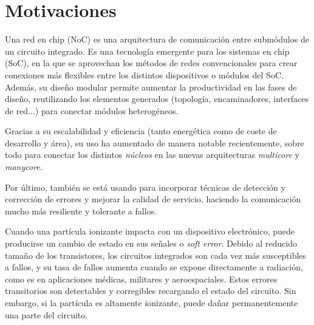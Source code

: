\chapter{Motivaciones}

Una red en chip (NoC) es una arquitectura de comunicación entre submódulos de un circuito integrado. Es una tecnología emergente para los sistemas en chip (SoC), en la que se aprovechan los métodos de redes convencionales para crear conexiones más flexibles entre los distintos dispositivos o módulos del SoC. 
Además, su diseño modular permite aumentar la productividad en las fases de diseño, reutilizando los elementos generados (topología, encaminadores, interfaces de red...) para conectar módulos heterogéneos.

Gracias a su escalabilidad y eficiencia (tanto energética como de coste de desarrollo y área), su uso ha aumentado de manera notable recientemente, sobre todo para conectar los distintos \textit{núcleos} en las nuevas arquitecturas \textit{multicore} y \textit{manycore}.

Por último, también se está usando para incorporar técnicas de detección y corrección de errores y mejorar la calidad de servicio, haciendo la comunicación mucho más resiliente y tolerante a fallos.

Cuando una partícula ionizante impacta con un dispositivo electrónico, puede producirse un cambio de estado en sus señales o \textit{soft error}. Debido al reducido tamaño de los transistores, los circuitos integrados son cada vez más susceptibles a fallos, y su tasa de fallos aumenta cuando se expone directamente a radiación, como es en aplicaciones médicas, militares y aeroespaciales. Estos errores transitorios son detectables y corregibles recargando el estado del circuito. Sin embargo, si la partícula es altamente ionizante, puede dañar permanentemente una parte del circuito.


